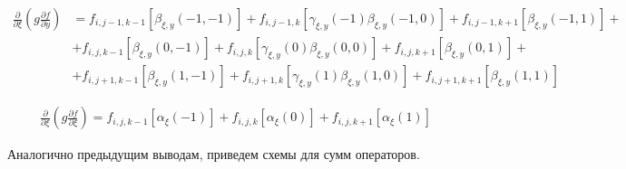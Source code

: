 \begin{equation*}
    \begin{split}
        \frac
            {\partial}
            {\partial \xi}
        \left(
            g
            \frac
                {\partial f}
                {\partial y}
        \right)
        &
        =
        f_{i, j-1, k-1}
        \left[
            \beta_{\xi, y} \left(-1, -1\right)
        \right]
        +
        f_{i, j-1, k}
        \left[
            \gamma_{\xi, y} \left(-1\right)
            \beta_{\xi, y} \left(-1, 0\right)
        \right]
        +
        f_{i, j-1, k+1}
        \left[
            \beta_{\xi, y} \left(-1, 1\right)
        \right]
        +
        \\
        &
        +
        f_{i, j, k-1}
        \left[
            \beta_{\xi, y} \left(0,-1\right)
        \right]
        +
        f_{i, j, k}
        \left[
            \gamma_{\xi, y} \left(0\right)
            \beta_{\xi, y} \left(0,0\right)
        \right]
        +
        f_{i, j, k+1}
        \left[
            \beta_{\xi, y} \left(0, 1\right)
        \right]
        +
        \\
        &
        +
        f_{i, j+1, k-1}
        \left[
            \beta_{\xi, y} \left(1, -1\right)
        \right]
        +
        f_{i, j+1, k}
        \left[
            \gamma_{\xi, y} \left(1\right)
            \beta_{\xi, y} \left(1, 0\right)
        \right]
        +
        f_{i, j+1, k+1}
        \left[
            \beta_{\xi, y} \left(1, 1\right)
        \right]
    \end{split}
\end{equation*}

\begin{equation*}
    \begin{split}
        \frac
            {\partial}
            {\partial \xi}
        \left(
            g
            \frac
                {\partial f}
                {\partial \xi}
        \right)
        =
        f_{i, j, k-1}
        \left[
            \alpha_{\xi} \left(-1\right)
        \right]
        +
        f_{i, j, k}
        \left[
            \alpha_{\xi} \left(0\right)
        \right]
        +
        f_{i, j, k+1}
        \left[
            \alpha_{\xi} \left(1\right)
        \right]
    \end{split}
\end{equation*}

Аналогично предыдущим выводам, приведем схемы для сумм
операторов.

